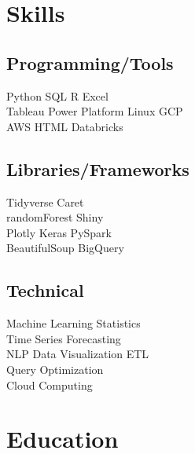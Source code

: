 \documentclass[]{plushcv}
\begin{document}
\begin{minipage}[t]{0.25\textwidth} 


\section{Skills}
\subsection{Programming/Tools}
\sectionsep
{}
Python \textbullet{} SQL \textbullet{} R \textbullet{} Excel \\
\sectionsep
{}
Tableau \textbullet{} Power Platform \textbullet{} Linux \textbullet{} GCP    \\
\sectionsep
{}
AWS \textbullet{} HTML \textbullet{} Databricks  \\
\sectionsep
\sectionsep
\subsection{Libraries/Frameworks}
\sectionsep
Tidyverse \textbullet{} Caret \textbullet{} \\ 
randomForest \textbullet{} Shiny \textbullet{} \\
Plotly \textbullet{} Keras \textbullet{} PySpark \textbullet{} \\
BeautifulSoup \textbullet{} BigQuery 

\sectionsep
\sectionsep
\subsection{Technical}
\sectionsep
Machine Learning \textbullet{} Statistics \\
Time Series Forecasting \textbullet{} \\
NLP  \textbullet{} Data Visualization \textbullet{} ETL \\
Query Optimization \textbullet{} \\ 
Cloud Computing

\sectionsep


\section{Education} 

\end{minipage}
\end{document}
